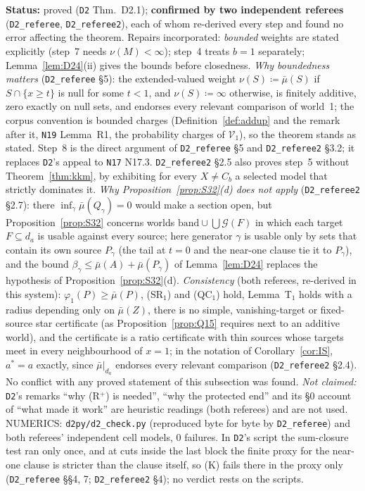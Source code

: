 \documentclass[11pt]{article}
\theoremstyle{definition}
\theoremstyle{remark}
\newcommand{\src}[1]{\texttt{#1}}
\newcommand{\status}[1]{\par\smallskip\noindent\textbf{Status:} #1\par\smallskip}
\begin{document}
\status{proved (\src{D2} Thm.~D2.1); \textbf{confirmed by two independent referees} (\src{D2\_referee}, \src{D2\_referee2}), each of whom re-derived every step and found no error affecting the theorem. Repairs incorporated: \emph{bounded} weights are stated explicitly (step~7 needs $\nu(M)<\infty$); step~4 treats $b=1$ separately; Lemma~\ref{lem:D24}(ii) gives the bounds before closedness. \emph{Why boundedness matters} (\src{D2\_referee} \S5): the extended-valued weight $\nu(S)\coloneqq\bar\mu(S)$ if $S\cap\{x\ge t\}$ is null for some $t<1$, and $\nu(S)\coloneqq\infty$ otherwise, is finitely additive, zero exactly on null sets, and endorses every relevant comparison of world~1; the corpus convention is bounded charges (Definition~\ref{def:addup} and the remark after it, \src{N19} Lemma~R1, the probability charges of $\mathcal V_1$), so the theorem stands as stated. Step~8 is the direct argument of \src{D2\_referee} \S5 and \src{D2\_referee2} \S3.2; it replaces \src{D2}'s appeal to \src{N17} N17.3. \src{D2\_referee2} \S2.5 also proves step~5 without Theorem~\ref{thm:kkm}, by exhibiting for every $X\ne C_b$ a selected model that strictly dominates it. \emph{Why Proposition~\ref{prop:S32}(d) does not apply} (\src{D2\_referee2} \S2.7): there $\inf_\gamma\bar\mu(Q_\gamma)=0$ would make a section open, but Proposition~\ref{prop:S32} concerns worlds $\mathrm{band}\cup\bigcup\mathcal G(F)$ in which each target $F\subseteq d_a$ is usable against every source; here generator $\gamma$ is usable only by sets that contain its own source $P_\gamma$ (the tail at $t=0$ and the near-one clause tie it to $P_\gamma$), and the bound $\beta_\gamma\le\bar\mu(A)+\bar\mu(P_\gamma)$ of Lemma~\ref{lem:D24} replaces the hypothesis of Proposition~\ref{prop:S32}(d). \emph{Consistency} (both referees, re-derived in this system): $\varphi_1(P)\ge\bar\mu(P)$, (SR$_1$) and (QC$_1$) hold, Lemma~T$_1$ holds with a radius depending only on $\bar\mu(Z)$, there is no simple, vanishing-target or fixed-source star certificate (as Proposition~\ref{prop:Q15} requires next to an additive world), and the certificate is a ratio certificate with thin sources whose targets meet in every neighbourhood of $x=1$; in the notation of Corollary~\ref{cor:IS}, $a^*=a$ exactly, since $\bar\mu|_{d_a}$ endorses every relevant comparison (\src{D2\_referee2} \S2.4). No conflict with any proved statement of this subsection was found. \emph{Not claimed:} \src{D2}'s remarks ``why (R$^+$) is needed'', ``why the protected end'' and its \S0 account of ``what made it work'' are heuristic readings (both referees) and are not used. NUMERICS: \src{d2py/d2\_check.py} (reproduced byte for byte by \src{D2\_referee}) and both referees' independent cell models, 0 failures. In \src{D2}'s script the sum-closure test ran only once, and at cuts inside the last block the finite proxy for the near-one clause is stricter than the clause itself, so (K) fails there in the proxy only (\src{D2\_referee} \S\S4, 7; \src{D2\_referee2} \S4); no verdict rests on the scripts.}
\end{document}
